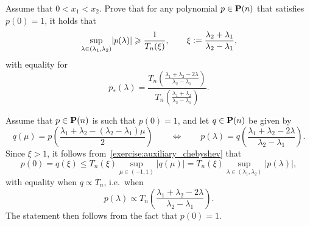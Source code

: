 \begin{exercise}
    \label{exercise:conjugate_gradient_chebyshev}
    Assume that $0 < x_1 < x_2$.
    Prove that for any polynomial $p \in \mathbf P(n)$ that satisfies $p(0) = 1$,
    it holds that
    \[
        \sup_{\lambda \in (\lambda_1, \lambda_2)} \lvert p(\lambda)\rvert \geqslant \frac{1}{T_n(\xi)},
        \qquad \xi := \frac{\lambda_2 + \lambda_1}{\lambda_2-  \lambda_1},
    \]
    with equality for
    \[
        p_*(\lambda) = \frac{T_n \left(\frac{\lambda_1 + \lambda_2 - 2\lambda}{\lambda_2 - \lambda_1} \right)}{T_n \left(\frac{\lambda_1 + \lambda_2}{\lambda_2 - \lambda_1} \right)}.
    \]
\end{exercise}
\begin{solution}
    Assume that $p \in \mathbf P(n)$ is such that $p(0) = 1$,
    and let $q \in \mathbf P(n)$ be given by
    \[
        q(\mu) = p\left(\frac{\lambda_1 + \lambda_2 - (\lambda_2 - \lambda_1) \mu}{2}\right)
        \qquad \Leftrightarrow \qquad
        p(\lambda) = q\left(\frac{\lambda_1 + \lambda_2 - 2\lambda}{\lambda_2 - \lambda_1}\right).
    \]
    Since $\xi > 1$,
    it follows from~\cref{exercise:auxiliary_chebyshev} that
    \[
        p(0) = q(\xi)
        \leq T_{n}(\xi) \sup_{\mu \in (-1, 1)} \lvert q(\mu) \rvert
        = T_{n}(\xi) \sup_{\lambda \in (\lambda_1, \lambda_2)} \lvert p(\lambda) \rvert,
    \]
    with equality when $q \propto T_n$,
    i.e.\ when
    \[
        p(\lambda) \propto T_n \left(\frac{\lambda_1 + \lambda_2 - 2\lambda}{\lambda_2 - \lambda_1} \right).
    \]
    The statement then follows from the fact that $p(0) = 1$.
\end{solution}

